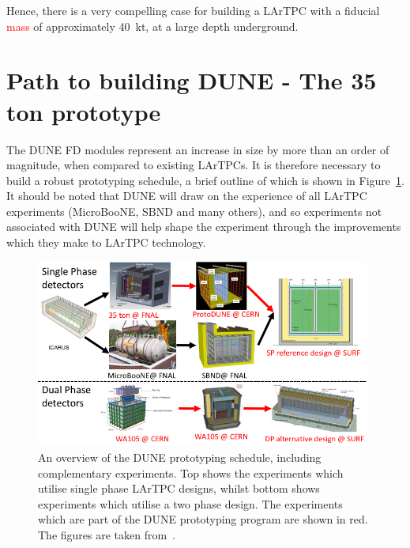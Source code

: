 Hence, there is a very compelling case for building a LArTPC with a fiducial \textcolor{red}{mass} of approximately 40~kt, at a large depth underground. \\

\section{Path to building DUNE - The 35 ton prototype} \label{sec:The35tonDetector}  %
The DUNE FD modules represent an increase in size by more than an order of magnitude, when compared to existing LArTPCs. It is therefore necessary to build a robust prototyping schedule, a brief outline of which is shown in Figure~\ref{fig:DUNEProtSched}. It should be noted that DUNE will draw on the experience of all LArTPC experiments (MicroBooNE, SBND and many others), and so experiments not associated with DUNE will help shape the experiment through the improvements which they make to LArTPC technology. \\ 

\begin{figure}
  \centering
  \includegraphics[width=0.98\textwidth]{PrototypeSched}
  \caption[An overview of the DUNE prototyping schedule, including complementary experiments]
          {An overview of the DUNE prototyping schedule, including complementary experiments. Top shows the experiments which utilise single phase LArTPC designs, whilst bottom shows experiments which utilise a two phase design. The experiments which are part of the DUNE prototyping program are shown in red. The figures are taken from~\citep{DUNECDR_V4, MarkReviewJuly2015}.}
  \label{fig:DUNEProtSched}
\end{figure}

